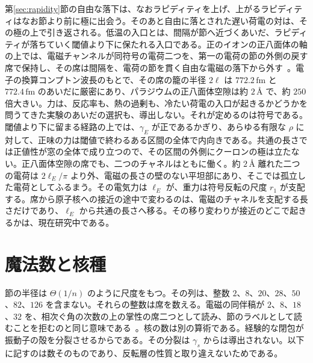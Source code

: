 \documentclass[a4paper]{article}
\begin{document}
第\ref{sec:rapidity}節の自由な落下は、なおラピディティを上げ、上がるラピディティはなお節より前に極に出会う。そのあと自由に落とされた遅い荷電の対は、その極の上で引き返される。低温の入口とは、間隔が節へ近づくあいだ、ラピディティが落ちていく閾値より下に保たれる入口である。正のイオンの正八面体の軸の上では、電磁チャンネルが同符号の電荷二つを、第一の電荷の節の外側の戻す席で保持し、その席は間隔を、電荷の節を貫く自由な電磁の落下から外す~\cite{dst-cold}。電子の換算コンプトン波長のもとで、その席の籠の半径 \(2\ell\) は \(772.2\,\mathrm{fm}\) と \(772.4\,\mathrm{fm}\) のあいだに厳密にあり、パラジウムの正八面体空隙は約 \(2\,\text{\AA}\) で、約 \(250\) 倍大きい。力は、反応率も、熱の過剰も、冷たい荷電の入口が起きるかどうかを問うてきた実験のあいだの選択も、導出しない。それが定めるのは符号である。閾値より下に留まる経路の上では、\(\gamma_E\) が正であるかぎり、あらゆる有限な \(\rho\) に対して、正味の力は閾値で終わるある区間の全体で内向きである。共通の長さでは正値性が窓の全体で成り立つので、その区間の外側にクーロンの極は立たない。正八面体空隙の席でも、二つのチャネルはともに働く。約 \(2\,\text{\AA}\) 離れた二つの電荷は \(2\ell_E/\pi\) より外、電磁の長さの壁のない平坦部にあり、そこでは孤立した電荷としてふるまう。その電気力は \(\ell_E\) が、重力は符号反転の尺度 \(r_1\) が支配する。席から原子核への接近の途中で変わるのは、電磁のチャネルを支配する長さだけであり、\(\ell_E\) から共通の長さへ移る。その移り変わりが接近のどこで起きるかは、現在研究中である。

\section{魔法数と核種}
\label{sec:magic}

節の半径は \(\Theta(1/n)\) のように尺度をもつ。その列は、整数 \(2\)、\(8\)、\(20\)、\(28\)、\(50\)、\(82\)、\(126\) を含まない。それらの整数は席を数える。電磁の同伴稿が \(2\)、\(8\)、\(18\)、\(32\) を、相次ぐ角の次数の上の掌性の席二つとして読み、節のラベルとして読むことを拒むのと同じ意味である~\cite{dst-shell}。核の数は別の算術である。経験的な閉包が振動子の殻を分裂させるからである。その分裂は \(\gamma_s\) からは導出されない。以下に記すのは数そのものであり、反転層の性質と取り違えないためである。
\end{document}
